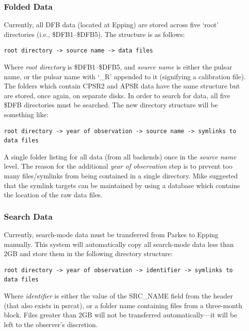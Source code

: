\documentclass[a4paper,11pt]{article}
\begin{document}
\subsubsection{Folded Data}
Currently, all DFB data (located at Epping) are stored across five `root' directories (i.e., \$DFB1--\$DFB5). The structure is as follows:

\begin{verbatim}
root directory -> source name -> data files
\end{verbatim}

Where \emph{root directory} is \$DFB1--\$DFB5, and \emph{source name} is either the pulsar name, or the pulsar name with `\_R' appended to it (signifying a calibration file). The folders which contain CPSR2 and APSR data have the same structure but are stored, once again, on separate disks. In order to search for data, all five \$DFB directories must be searched. The new directory structure will be something like:

\begin{verbatim}
root directory -> year of observation -> source name -> symlinks to data files
\end{verbatim}

A single folder listing for all data (from all backends) once in the \emph{source name} level. The reason for the additional \emph{year of observation} step is to prevent too many files/symlinks from being contained in a single directory. Mike suggested that the symlink targets can be maintained by using a database which contains the location of the raw data files.

\subsubsection{Search Data}
Currently, search-mode data must be transferred from Parkes to Epping manually. This system will automatically copy all search-mode data less than 2GB and store them in the following directory structure:

\begin{verbatim}
root directory -> year of observation -> identifier -> symlinks to data files
\end{verbatim}

Where \emph{identifier} is either the value of the SRC\_NAME field from the header (that also exists in psrcat), or a folder name containing files from a three-month block. Files greater than 2GB will not be transferred automatically---it will be left to the observer's discretion.
\end{document}
